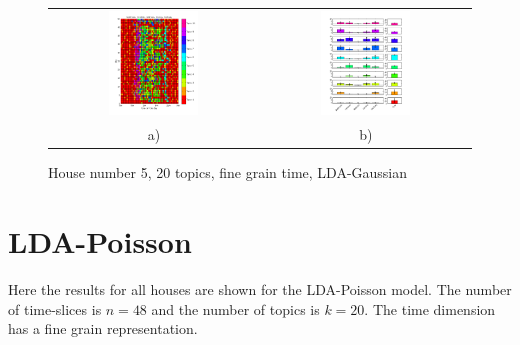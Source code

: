 \begin{figure}[h!]
 \centering
 \begin{tabular}{c c}
  \includegraphics[width=0.45\textwidth]{Pictures/Gaus/fine/DayHN5TS48k20fine.png}
  &
  \includegraphics[width=0.45\textwidth]{Pictures/Gaus/fine/TopHN5TS48k20fine.png}\\
  a) & b)
 \end{tabular}
  \caption{House number 5, 20 topics, fine grain time, LDA-Gaussian}
\end{figure}

\chapter{LDA-Poisson}
\label{B}
Here the results for all houses are shown for the LDA-Poisson model. The number of time-slices is $n=48$ and the number of topics is $k=20$. The time dimension has a fine grain representation.


